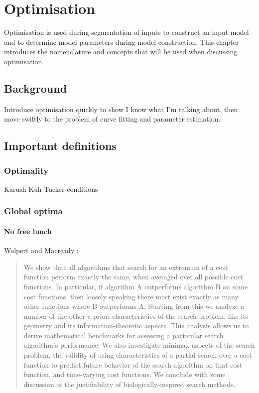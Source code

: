 \chapter{Optimisation}
\begin{overview}
  Optimisation is used  during segmentation of inputs to construct an
  input model and to determine model parameters during model
  construction.  This chapter introduces the nomenclature and concepts
  that will be used when discussing optimisation.
\end{overview}

\section{Background}
Introduce optimisation quickly to show I know what I'm talking about,
then move swiftly to the problem of curve fitting and parameter estimation.

\section{Important definitions}
\subsection{Optimality}
Karush-Kuh-Tucker conditions

\subsection{Global optima}

\subsubsection{No free lunch}
Wolpert and Macready \citehere:

\begin{quote}
  We show that all algorithms that search for an extremum of a cost
  function perform exactly the same, when averaged over all possible
  cost functions. In particular, if algorithm A outperforms algorithm
  B on some cost functions, then loosely speaking there must exist
  exactly as many other functions where B outperforms A. Starting from
  this we analyze a number of the other a priori characteristics of
  the search problem, like its geometry and its information-theoretic
  aspects. This analysis allows us to derive mathematical benchmarks
  for assessing a particular search algorithm's performance. We also
  investigate minimax aspects of the search problem, the validity of
  using characteristics of a partial search over a cost function to
  predict future behavior of the search algorithm on that cost
  function, and time-varying cost functions. We conclude with some
  discussion of the justifiability of biologically-inspired search
  methods.
\end{quote}

